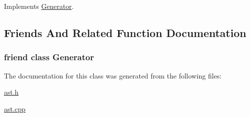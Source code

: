 Implements \hyperlink{classGenerator_ac9871b3d5874cb81a98a3e5eb3b703e2}{Generator}.



\subsection{Friends And Related Function Documentation}
\hypertarget{classObjPascalGenerator_a366b7823e659ab78d952a7d79662a4d6}{}
\subsubsection[{Generator}]{\setlength{\rightskip}{0pt plus 5cm}friend class {\bf Generator}\hspace{0.3cm}{\ttfamily [friend]}}\label{classObjPascalGenerator_a366b7823e659ab78d952a7d79662a4d6}


The documentation for this class was generated from the following files\+:\begin{DoxyCompactItemize}
\item 
\hyperlink{ast_8h}{ast.\+h}\item 
\hyperlink{ast_8cpp}{ast.\+cpp}\end{DoxyCompactItemize}
